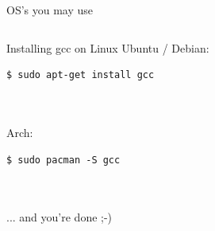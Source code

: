 \begin{frame}{OS's you may use}
\begin{columns}[T]
	\end{columns}
\end{frame}
\begin{frame}[fragile]{Installing gcc on Linux}
	Ubuntu / Debian: 
	\begin{lstlisting}[numbers=none]
$ sudo apt-get install gcc
\end{lstlisting} \ \\ \ \\
	Arch:
	\begin{lstlisting}[numbers=none]
$ sudo pacman -S gcc
\end{lstlisting} \ \\ \ \\
	... and you're done ;-)
\end{frame}
